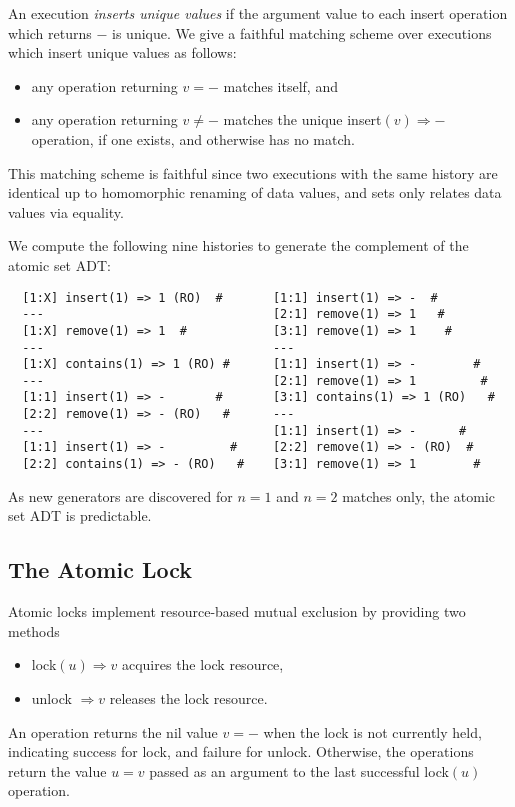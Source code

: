 An execution \emph{inserts unique values} if the argument value to each insert
operation which returns $-$ is unique. We give a faithful matching
scheme over executions which insert unique values as follows:
\begin{itemize}

  \item any operation returning $v = -$ matches itself, and

  \item any operation returning $v \neq -$ matches the unique
  insert$(v) \Rightarrow -$ operation, if one exists, and otherwise
  has no match.

\end{itemize}
This matching scheme is faithful since two executions with the same history are
identical up to homomorphic renaming of data values, and sets only relates data
values via equality.

We compute the following nine histories to generate the complement of the
atomic set ADT:
\begin{verbatim}
  [1:X] insert(1) => 1 (RO)  #       [1:1] insert(1) => -  #
  ---                                [2:1] remove(1) => 1   #
  [1:X] remove(1) => 1  #            [3:1] remove(1) => 1    #
  ---                                ---
  [1:X] contains(1) => 1 (RO) #      [1:1] insert(1) => -        #
  ---                                [2:1] remove(1) => 1         #
  [1:1] insert(1) => -       #       [3:1] contains(1) => 1 (RO)   #
  [2:2] remove(1) => - (RO)   #      ---
  ---                                [1:1] insert(1) => -      #
  [1:1] insert(1) => -         #     [2:2] remove(1) => - (RO)  #
  [2:2] contains(1) => - (RO)   #    [3:1] remove(1) => 1        #
\end{verbatim}
As new generators are discovered for $n=1$ and $n=2$ matches only, the atomic
set ADT is predictable.

\subsection{The Atomic Lock}

Atomic locks implement resource-based mutual exclusion by providing two
methods
\begin{itemize}

  \item lock$(u) \Rightarrow v$ acquires the lock resource,

  \item unlock $\Rightarrow v$ releases the lock resource.

\end{itemize}
An operation returns the nil value $v = -$ when the lock is not
currently held, indicating success for lock, and failure for unlock. Otherwise,
the operations return the value $u = v$ passed as an argument to the last
successful lock$(u)$ operation.

